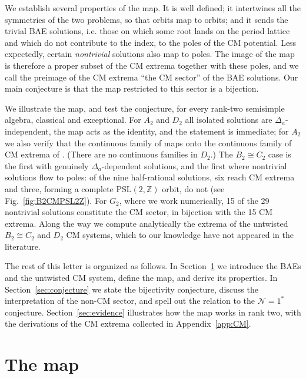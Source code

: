\documentclass[aps, prx, nofootinbib, twocolumn,amsfonts,amsmath,amssymb,mathtools,superscriptaddress,preprintnumbers,floatfix,reprint]{revtex4-2}
\begin{document}
We establish several properties of the map. It is well defined; it intertwines
all the symmetries of the two problems, so that orbits map to orbits; and it
sends the trivial BAE solutions, i.e. those on which some root lands on the period
lattice and which do not contribute to the index, to the poles of the CM
potential. Less expectedly, certain \emph{nontrivial} solutions also map to
poles. The image of the map is therefore a proper subset of the CM extrema
together with these poles, and we call the preimage of the CM extrema ``the CM
sector'' of the BAE solutions. Our main conjecture is that the map restricted to this sector is a
bijection.

We illustrate the map, and test the conjecture, for every rank-two semisimple algebra, classical and
exceptional. For $A_2$ and $D_2$ all isolated solutions are $\Delta_a$-independent, the
map acts as the identity, and the statement is immediate; for $A_2$ we also
verify that the continuous family of \cite{Benini:2021ano} maps onto the
continuous family of CM extrema of \cite{Bourget:2015upj}. (There are no continuous families in $D_2$.) The 
$B_2\cong C_2$ case is the first with genuinely $\Delta_a$-dependent solutions, and
the first where nontrivial solutions flow to poles: of the nine half-rational
solutions, six reach CM extrema and three, forming a complete
$\mathrm{PSL}(2,\mathbb{Z})$ orbit, do not (see Fig.~\ref{fig:B2CMPSL2Z}). For $G_2$, where we work
numerically, 15 of the 29 nontrivial solutions constitute the CM sector,
in bijection with the 15 CM extrema. Along the way we compute analytically the extrema of
the untwisted $B_2\cong C_2$ and $D_2$ CM systems, which to our knowledge have not
appeared in the literature.

\medskip

The rest of this letter is organized as follows. In Section~\ref{sec:map} we introduce
the BAEs and the untwisted CM system, define the map, and derive its
properties. In Section~\ref{sec:conjecture} we state the bijectivity conjecture,
discuss the interpretation of the non-CM sector, and spell out the relation to
the $\mathcal{N}=1^\ast$ conjecture. Section~\ref{sec:evidence} illustrates how the map works in rank two, with the derivations of the CM extrema collected in Appendix~\ref{app:CM}.

\section{The map}
\label{sec:map}
\end{document}
